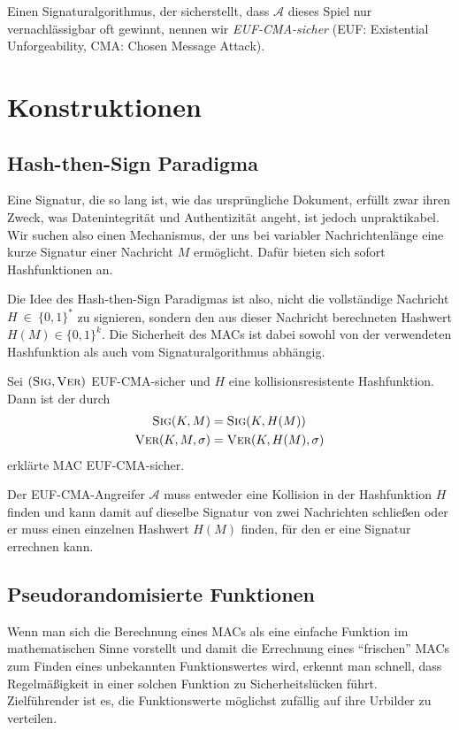 Einen Signaturalgorithmus, der sicherstellt, dass $\mathcal{A}$ dieses Spiel nur vernachlässigbar oft gewinnt, nennen wir \textit{EUF-CMA-sicher} (EUF:
Existential Unforgeability, CMA: Chosen Message Attack).

\section{Konstruktionen}

\subsection{Hash-then-Sign Paradigma}
Eine Signatur, die so lang ist, wie das ursprüngliche Dokument, erfüllt zwar ihren Zweck, was Datenintegrität und Authentizität angeht, ist jedoch
unpraktikabel. Wir suchen also einen Mechanismus, der uns bei variabler Nachrichtenlänge eine kurze Signatur einer Nachricht $M$ ermöglicht. Dafür bieten sich
sofort Hashfunktionen an.

Die Idee des Hash-then-Sign Paradigmas ist also, nicht die vollständige Nachricht $H~\in~\{0,1\}^*$ zu signieren, sondern den aus dieser Nachricht berechneten
Hashwert $H(M) \in \{0,1\}^k$. Die Sicherheit des MACs ist dabei sowohl von der verwendeten Hashfunktion als auch vom Signaturalgorithmus
abhängig.~\\

\begin{theorem}
Sei $(\textsc{Sig}, \textsc{Ver})$ EUF-CMA-sicher und $H$ eine kollisionsresistente Hashfunktion. Dann ist der durch 
\begin{align*}
\textsc{Sig}(K,M) &= \textsc{Sig}(K,H(M))\\
\textsc{Ver}(K,M,\sigma) &= \textsc{Ver}(K,H(M),\sigma) 
\end{align*}
erklärte MAC EUF-CMA-sicher.~\\
\end{theorem}

\begin{beweis}[Entwurf]
\label{ch:symauth:eufcma-beweis}
Der EUF-CMA-Angreifer $\mathcal{A}$ muss entweder eine Kollision in der Hashfunktion $H$ finden und kann damit auf dieselbe Signatur von zwei Nachrichten
schließen oder er muss einen einzelnen Hashwert $H(M)$ finden, für den er eine Signatur errechnen kann.
\end{beweis}

\subsection{Pseudorandomisierte Funktionen}
Wenn man sich die Berechnung eines MACs als eine einfache Funktion im mathematischen Sinne vorstellt und damit die Errechnung eines "`frischen"' MACs zum
Finden eines unbekannten Funktionswertes wird, erkennt man schnell, dass Regelmäßigkeit in einer solchen Funktion zu Sicherheitslücken führt. Zielführender ist
es, die Funktionswerte möglichst zufällig auf ihre Urbilder zu verteilen.
\vspace{10pt}

